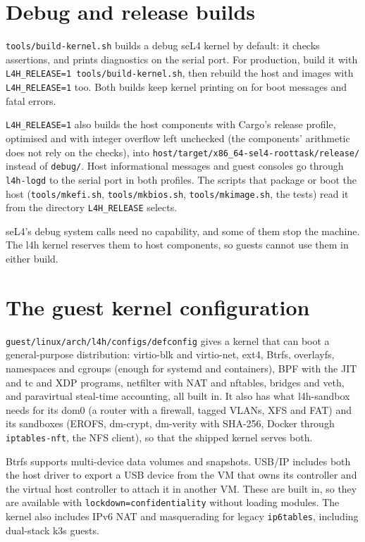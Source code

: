 \documentclass[11pt,a4paper]{report}
\newcommand{\cmd}[1]{\texttt{#1}}
\newcommand{\file}[1]{\texttt{#1}}
\begin{document}
\section{Debug and release builds}
\label{sec:release}

\cmd{tools/build-kernel.sh} builds a debug seL4 kernel by default: it checks
assertions, and prints diagnostics on the serial port. For production, build
it with \texttt{L4H\_RELEASE=1 tools/build-kernel.sh}, then rebuild the host
and images with \texttt{L4H\_RELEASE=1} too. Both builds keep kernel printing
on for boot messages and fatal errors.

\texttt{L4H\_RELEASE=1} also builds the host components with Cargo's
release profile, optimised and with integer overflow left unchecked (the
components' arithmetic does not rely on the checks), into
\file{host/target/\allowbreak x86\_64-sel4-roottask/\allowbreak release/}
instead of \file{debug/}. Host informational messages and guest consoles
go through \texttt{l4h-logd} to the serial port in both profiles. The
scripts that package or boot the host (\cmd{tools/mkefi.sh},
\cmd{tools/mkbios.sh}, \cmd{tools/mkimage.sh}, the tests) read it from
the directory \texttt{L4H\_RELEASE} selects.

seL4's debug system calls need no capability, and some of them stop the
machine. The l4h kernel reserves them to host components, so guests cannot
use them in either build.

\section{The guest kernel configuration}

\file{guest/linux/arch/l4h/configs/defconfig} gives a kernel that can boot a
general-purpose distribution: virtio-blk and virtio-net, ext4, Btrfs, overlayfs,
namespaces and cgroups (enough for systemd and containers), BPF with the
JIT and tc and XDP programs, netfilter
with NAT and nftables, bridges and veth, and paravirtual steal-time
accounting, all built in. It also has what l4h-sandbox needs for its dom0 (a
router with a firewall, tagged VLANs, XFS and FAT) and its sandboxes
(EROFS, dm-crypt, dm-verity with SHA-256, Docker through
\texttt{iptables-nft}, the NFS client), so that the shipped kernel serves
both.

Btrfs supports multi-device data volumes and snapshots. USB/IP includes
both the host driver to export a USB device from the VM that owns its
controller and the virtual host controller to attach it in another VM.
These are built in, so they are available with
\texttt{lockdown=confidentiality} without loading modules. The kernel also
includes IPv6 NAT and masquerading for legacy \texttt{ip6tables}, including
dual-stack k3s guests.
\end{document}

